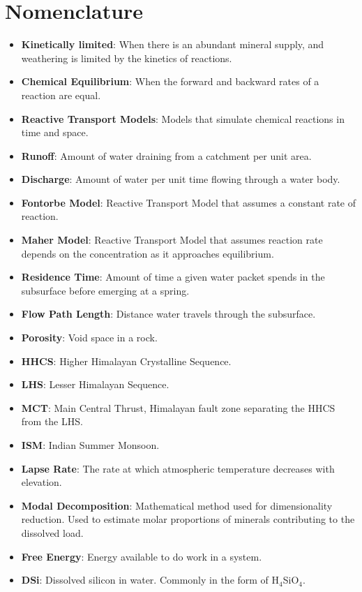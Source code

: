 \documentclass[hidelinks, 12pt]{article} %
\begin{document}
\newpage

\section*{Nomenclature}

{\normalsize


\begin{itemize}[wide]
  \setlength{\itemindent}{-0mm}  %

  \item[] \textbf{Kinetically limited}: When there is an abundant mineral supply, and weathering is limited by the kinetics of reactions.
  \item[] \textbf{Chemical Equilibrium}: When the forward and backward rates of a reaction are equal.
  \item[] \textbf{Reactive Transport Models}: Models that simulate chemical reactions in time and space.
  \item[] \textbf{Runoff}: Amount of water draining from a catchment per unit area.
  \item[] \textbf{Discharge}: Amount of water per unit time flowing through a water body.
  \item[] \textbf{Fontorbe Model}: Reactive Transport Model that assumes a constant rate of reaction.
  \item[] \textbf{Maher Model}: Reactive Transport Model that assumes reaction rate depends on the concentration as it approaches equilibrium.
  \item[] \textbf{Residence Time}: Amount of time a given water packet spends in the subsurface before emerging at a spring.
  \item[] \textbf{Flow Path Length}: Distance water travels through the subsurface.
  \item[] \textbf{Porosity}: Void space in a rock.
  \item[] \textbf{HHCS}: Higher Himalayan Crystalline Sequence.
  \item[] \textbf{LHS}: Lesser Himalayan Sequence.
  \item[] \textbf{MCT}: Main Central Thrust, Himalayan fault zone separating the HHCS from the LHS.
  \item[] \textbf{ISM}: Indian Summer Monsoon.
  \item[] \textbf{Lapse Rate}: The rate at which atmospheric temperature decreases with elevation.
  \item[] \textbf{Modal Decomposition}: Mathematical method used for dimensionality reduction. Used to estimate molar proportions of minerals contributing to the dissolved load.
  \item[] \textbf{Free Energy}: Energy available to do work in a system.
  \item[] \textbf{DSi}: Dissolved silicon in water. Commonly in the form of H$_4$SiO$_4$.



\end{itemize}}
\end{document}
